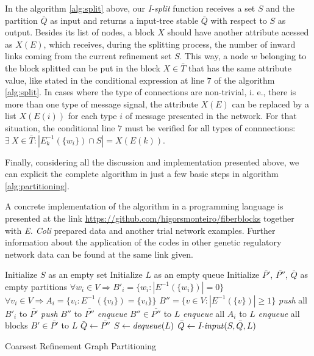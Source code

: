 \documentclass[12pt]{diazessay} %
\begin{document}
In the algorithm \ref{alg:split} above, our \textit{I-split} function receives a set $S$ and the partition $\bar{Q}$ as input and returns a input-tree stable $\bar{Q}$ with respect to $S$ as output. Besides its list of nodes, a block $X$ should have another attribute acessed as $X(E)$, which receives, during the splitting process, the number of inward links coming from the current refinement set $S$. This way, a node $w$ belonging to the block splitted can be put in the block $X \in \bar{T}$ that has the same attribute value, like stated in the conditional expression at line $7$ of the algorithm \ref{alg:split}. In cases where the type of connections are non-trivial, i. e., there is more than one type of message signal, the attribute $X(E)$ can be replaced by a list $X(E(i))$ for each type $i$ of message presented in the network. For that situation, the conditional line $7$ must be verified for all types of connnections: $\exists \ X \in \bar{T} : | E_k^{-1}(\{w_i\})\cap S | = X(E(k))$.

Finally, considering all the discussion and implementation presented above, we can explicit the complete algorithm in just a few basic steps in algorithm \ref{alg:partitioning}.

A concrete implementation of the algorithm in a programming language is presented at the link \url{https://github.com/higorsmonteiro/fiberblocks} together with \textit{E. Coli} prepared data and another trial network examples. Further information about the application of the codes in other genetic regulatory network data can be found at the same link given.

\begin{algorithm}[h]
	\SetAlgoLined
	Initialize $S$ as an empty set\;
	Initialize $L$ as an empty queue\;
	Initialize $\bar{P'}$, $\bar{P''}$, $\bar{Q}$ as empty partitions\;
	$\forall w_i \in V \Rightarrow B'_{i} = \{ w_i : |E^{-1}(\{w_i\})|=0 \}$\;
	$\forall v_i \in V \Rightarrow A_i = \{ v_i : E^{-1}(\{v_i\}) = \{v_i\} \}$\;
	$B'' = \{ v \in V : |E^{-1}(\{v\})| \geq 1 \}$\;
	\textit{push} all $B'_{i}$ to $\bar{P'}$\;
	\textit{push} $B''$ to $\bar{P''}$\;
	\textit{enqueue} $B'' \in \bar{P''}$ to $L$\;
	\textit{enqueue} all $A_i$ to $L$\;
	\textit{enqueue} all blocks $B' \in \bar{P'}$ to $L$\;
	$\bar{Q} \leftarrow \bar{P''}$\;
	{
		$S \leftarrow \text{\textit{dequeue}}(L)$\;
		$\bar{Q} \leftarrow \text{\textit{I-input}}(S, \bar{Q}, L)$
	}
	\caption{Coarsest Refinement Graph Partitioning}
	\label{alg:partitioning}
\end{algorithm}
\end{document}
